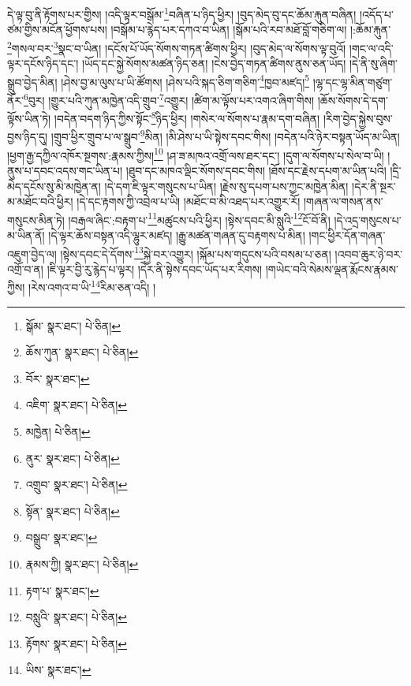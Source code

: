 དེ་ལྟ་བུ་ནི་རྟོགས་པར་གྱིས། །འདི་ལྟར་བསྒོམ་\footnote{སྒོམ་  སྣར་ཐང་།  པེ་ཅིན། }བཞིན་པ་ཉིད་ཕྱིར། །བུད་མེད་བུ་དང་ཆོམ་རྐུན་བཞིན། །འདོད་པ་ཙམ་གྱིས་མངོན་ཕྱོགས་པས། །བསྒོམ་པ་རྙེད་པར་དཀའ་བ་ཡིན། །སྒོམ་པའི་རབ་མཐོ་བློ་གཅིག་ལ། །:ཆོམ་རྐུན་\footnote{ཆོས་ཀུན་  སྣར་ཐང་།  པེ་ཅིན། }གསལ་བར་\footnote{བོར་  སྣར་ཐང་། }སྣང་བ་ཡིན། །དངོས་པོ་ཡོད་སོགས་གཏན་ཚིགས་ཕྱིར། །བུད་མེད་ལ་སོགས་ལྟ་བུའོ། །གང་ལ་འདི་ལྟར་དངོས་ཉིད་དང་། །ཡོད་དང་སྐྱེ་སོགས་མཚན་ཉིད་ཅན། །ངེས་བྱེད་གཏན་ཚིགས་ནུས་ཅན་ཡོད། །དེ་ནི་སུ་ཞིག་སྒྲུབ་བྱེད་མིན། །ཤེས་བྱ་མ་ལུས་པ་ཡི་ཚོགས། །ཤེས་པའི་སྐད་ཅིག་གཅིག་\footnote{འཇིག་  སྣར་ཐང་།  པེ་ཅིན། }ཁྱབ་མཛད།\footnote{མཁྱེན།  པེ་ཅིན། } །ལྷ་དང་ལྷ་མིན་གཙུག་ནོར་\footnote{ནུར་  སྣར་ཐང་།  པེ་ཅིན། }བུར། །གྱུར་པའི་ཀུན་མཁྱེན་འདི་གྲུབ་\footnote{འགྲུབ་  སྣར་ཐང་།  པེ་ཅིན། }འགྱུར། །ཚིག་མ་ལྟོས་པར་འགའ་ཞིག་གིས། །ཆོས་སོགས་དེ་དག་ལྟོས་ཡིན་ཏེ། །བདེན་བདག་ཉིད་ཀྱིས་སྟོང་\footnote{སྟོན་  སྣར་ཐང་།  པེ་ཅིན། }ཉིད་ཕྱིར། །གསེར་ལ་སོགས་པ་རྣམ་དག་བཞིན། །རིག་བྱེད་སྐྱེས་བུས་བྱས་ཉིད་དུ། །གྲུབ་ཕྱིར་གྲུབ་པ་ལ་སྒྲུབ་\footnote{བསྒྲུབ་  སྣར་ཐང་། }མིན། །མི་ཤེས་པ་ཡི་སྟེས་དབང་གིས། །བདེན་པའི་ཉེར་བསྟན་ཡོད་མ་ཡིན། །ཕྱག་རྒྱ་དཀྱིལ་འཁོར་སྔགས་:རྣམས་ཀྱིས།\footnote{རྣམས་ཀྱི།  སྣར་ཐང་།  པེ་ཅིན། } །ཤ་ཟ་མཁའ་འགྲོ་ལས་ཐར་དང་། །དུག་ལ་སོགས་པ་སེལ་བ་ཡི། །ནུས་པ་དབང་འདས་གང་ཡིན་པ། །ཐུབ་དང་མཁའ་ལྡིང་སོགས་དབང་གིས། །ཐོས་དང་རྗེས་དཔག་མ་ཡིན་པའི། །དྲི་མེད་དངོས་སུ་མི་མཁྱེན་ན། །དེ་དག་ཇི་ལྟར་གསུངས་པ་ཡིན། །རྗེས་སུ་དཔག་པས་ཀྱང་མཁྱེན་མིན། །དེར་ནི་སྔར་མ་མཐོང་བའི་ཕྱིར། །དེ་དང་རྟགས་ཀྱི་འབྲེལ་པ་ཡི། །མཐོང་བ་མི་འཐད་པར་འགྱུར་རོ། །གཞན་ལ་གསན་ནས་གསུངས་མིན་ཏེ། །བརྒལ་ཞིང་:བརྟག་པ་\footnote{རྟག་པ་  སྣར་ཐང་། }མཚུངས་པའི་ཕྱིར། །སྟེས་དབང་མི་སླུའི་\footnote{བསླུའི་  སྣར་ཐང་།  པེ་ཅིན། }ངོ་བོ་ནི། །དེ་འདྲ་གསུངས་པ་མ་ཡིན་ནོ། །དེ་ལྟར་ཆོས་བསྟན་འདི་ལྷུར་མཛད། །རྒྱུ་མཚན་གཞན་དུ་བརྟགས་པ་མིན། །གང་ཕྱིར་དོན་གཞན་འཇུག་བྱེད་ལ། །སྟེས་དབང་དེ་དོགས་\footnote{རྟོགས་  སྣར་ཐང་།  པེ་ཅིན། }སྐྱེ་བར་འགྱུར། །སྐོམ་པས་གདུངས་པའི་བསམ་པ་ཅན། །འབབ་ཆུར་ཉེ་བར་འགྲོ་བ་ན། །ཇི་ལྟར་བྱི་རུ་རྙེད་པ་ལྟར། །དེར་ནི་སྟེས་དབང་ཡོད་པར་རིགས། །གཡེང་བའི་སེམས་ལྡན་རྨོངས་རྣམས་ཀྱིས། །རེས་འགའ་བ་ཡི་\footnote{ཡིས་  སྣར་ཐང་། }རིམ་ཅན་འདི། །

